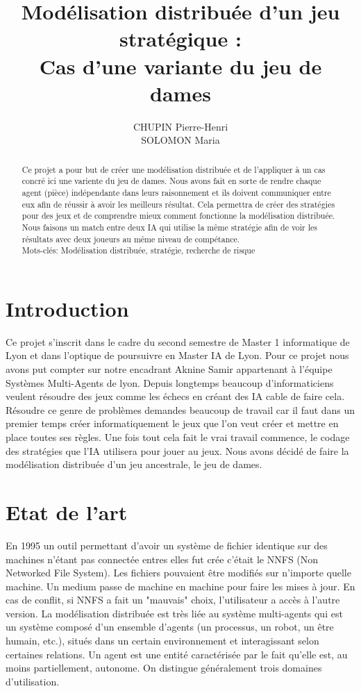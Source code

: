 \documentclass[11pt]{article} %
\title{Modélisation distribuée d’un jeu stratégique : 
 \\ Cas d'une variante du jeu de dames}
\author{CHUPIN Pierre-Henri \\ SOLOMON Maria}
\date{} %
\begin{document}
\maketitle

\begin{abstract}
Ce  projet  a  pour  but  de  créer  une modélisation distribuée et de l'appliquer à un cas concré ici une variente du jeu de dames. Nous avons fait en sorte de rendre chaque agent (pièce) indépendante dans leurs raisonnement et ils doivent communiquer entre eux afin de réussir à avoir les meilleurs résultat. Cela permettra de créer des stratégies pour des jeux et de comprendre mieux comment fonctionne la modélisation distribuée. Nous faisons un match entre deux IA qui utilise la même stratégie afin de voir les résultats avec deux joueurs au même niveau de compétance. \\
Mots-clés: Modélisation distribuée, stratégie, recherche de risque
\end{abstract}
\section{Introduction}
Ce projet s'inscrit dans le cadre du second semestre de Master 1 informatique de Lyon et dans l'optique de poursuivre en Master IA de Lyon. Pour ce projet nous avons put compter sur notre encadrant Aknine Samir appartenant à l'équipe Systèmes Multi-Agents de lyon. Depuis longtemps beaucoup d'informaticiens veulent résoudre des jeux comme les échecs en créant des IA cable de faire cela. Résoudre ce genre de problèmes demandes beaucoup de travail car il faut dans un premier temps créer informatiquement le jeux que l’on veut créer et mettre en place toutes ses règles. Une fois tout cela fait le vrai travail commence, le codage des stratégies que l’IA utilisera pour jouer au jeux. Nous avons décidé de faire la modélisation distribuée d'un jeu ancestrale, le jeu de dames. 

\section{Etat de l'art}
En 1995 un outil permettant d'avoir un système de fichier identique sur des machines n'étant pas connectée entres elles fut crée c'était le NNFS (Non Networked File System). Les fichiers pouvaient être modifiés sur n'importe quelle machine. Un medium passe de machine en machine pour faire les mises à jour. En cas de conflit, si NNFS a fait un "mauvais" choix, l'utilisateur a accès à l'autre version. La modélisation distribuée est très liée au système multi-agents qui est un système composé d'un ensemble d'agents (un processus, un robot, un être humain, etc.), situés dans un certain environnement et interagissant selon certaines relations. Un agent est une entité caractérisée par le fait qu'elle est, au moins partiellement, autonome. On distingue généralement trois domaines d'utilisation.
\end{document}
